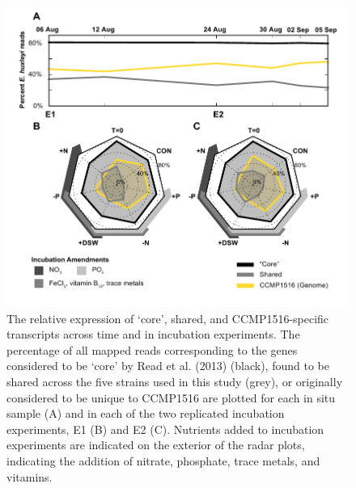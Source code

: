 \begin{figure}[p!]

  \centering
  \includegraphics[width=1\textwidth]{Images/C6_FigureS8_core_genes.pdf}
  \caption[The relative expression of `core', shared, and CCMP1516-specific transcripts across time and in incubation experiments]{The relative expression of `core', shared, and CCMP1516-specific transcripts across time and in incubation experiments. The percentage of all mapped reads corresponding to the genes considered to be ‘core’ by Read et al. (2013) (black), found to be shared across the five strains used in this study (grey), or originally considered to be unique to CCMP1516 are plotted for each in situ sample (A) and in each of the two replicated incubation experiments, E1 (B) and E2 (C). Nutrients added to incubation experiments are indicated on the exterior of the radar plots, indicating the addition of nitrate, phosphate, trace metals, and vitamins.}
    \label{fig:a5f8}
\end{figure}




